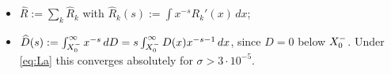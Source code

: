 \begin{itemize}
$h(u_a)\ge h(a)(u_a/a)^{1/8}\ge h(a)(1-\epsilon)^{1/8}$ as $b\le\frac18$.
(iv) $1-w_a(s)=(1-M)+\int_{u_a}^a\bigl(1-(a/u)^s\bigr)g(u)\,du$. Here $1-M\le\log(h(a)/h(u_a))\le\frac18\log(a/u_a)\le1.01\epsilon/8$, and, by
$|e^z-1|\le|z|e^{\max(0,\operatorname{Re}z)}$, $|1-(a/u)^s|\le|s|\log(a/u_a)(a/u_a)^{\sigma}\le|s|\epsilon(1-\epsilon)^{-3}\le1.01|s|\epsilon$;
with $M\le1$ this gives the first bound. For $|t|\ge2\ge\sigma$ we have $|s|\le\sqrt2|t|$, and $1.01(\sqrt2|t|+\frac18)\le2|t|$.
\item $\widehat R:=\sum_k\widehat R_k$ with $\widehat R_k(s):=\int x^{-s}R_k'(x)\,dx$;
\item $\widehat D(s):=\int_{X_0^{-}}^\infty x^{-s}\,dD=s\int_{X_0^{-}}^\infty D(x)x^{-s-1}\,dx$, since $D=0$ below $X_0^{-}$. Under \eqref{eq:La}
this converges absolutely for $\sigma>3\cdot10^{-5}$.
\end{itemize}

